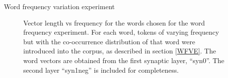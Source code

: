 \documentclass{article} %
\begin{document}
\begin{section}{Word frequency variation experiment}
\begin{figure}\label{fig:word-frequency-experiment-graph}
	\caption{
	Vector length vs frequency for the words chosen for the word frequency
	experiment.  For each word, tokens of varying frequency but with the
	co-occurrence distribution of that word were introduced into the
	corpus, as described in section \ref{WFVE}.
	The word vectors are obtained from the first synaptic layer, ``syn0''.
	The second layer ``syn1neg'' is included for completeness.
	}
\end{figure}

\end{section}
\end{document}
